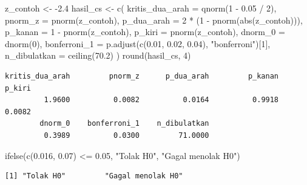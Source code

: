\documentclass[
  indonesian,
  letterpaper,
]{book}
\newenvironment{Shaded}{\begin{snugshade}}{\end{snugshade}}
\newcommand{\AttributeTok}[1]{\textcolor[rgb]{0.40,0.45,0.13}{#1}}
\newcommand{\DecValTok}[1]{\textcolor[rgb]{0.68,0.00,0.00}{#1}}
\newcommand{\FloatTok}[1]{\textcolor[rgb]{0.68,0.00,0.00}{#1}}
\newcommand{\FunctionTok}[1]{\textcolor[rgb]{0.28,0.35,0.67}{#1}}
\newcommand{\NormalTok}[1]{\textcolor[rgb]{0.00,0.23,0.31}{#1}}
\newcommand{\OtherTok}[1]{\textcolor[rgb]{0.00,0.23,0.31}{#1}}
\newcommand{\SpecialCharTok}[1]{\textcolor[rgb]{0.37,0.37,0.37}{#1}}
\newcommand{\StringTok}[1]{\textcolor[rgb]{0.13,0.47,0.30}{#1}}
\begin{document}
\begin{Shaded}
\begin{Highlighting}[]
\NormalTok{z\_contoh }\OtherTok{\textless{}{-}} \SpecialCharTok{{-}}\FloatTok{2.4}
\NormalTok{hasil\_cs }\OtherTok{\textless{}{-}} \FunctionTok{c}\NormalTok{(}
  \AttributeTok{kritis\_dua\_arah =} \FunctionTok{qnorm}\NormalTok{(}\DecValTok{1} \SpecialCharTok{{-}} \FloatTok{0.05} \SpecialCharTok{/} \DecValTok{2}\NormalTok{),}
  \AttributeTok{pnorm\_z         =} \FunctionTok{pnorm}\NormalTok{(z\_contoh),}
  \AttributeTok{p\_dua\_arah      =} \DecValTok{2} \SpecialCharTok{*}\NormalTok{ (}\DecValTok{1} \SpecialCharTok{{-}} \FunctionTok{pnorm}\NormalTok{(}\FunctionTok{abs}\NormalTok{(z\_contoh))),}
  \AttributeTok{p\_kanan         =} \DecValTok{1} \SpecialCharTok{{-}} \FunctionTok{pnorm}\NormalTok{(z\_contoh),}
  \AttributeTok{p\_kiri          =} \FunctionTok{pnorm}\NormalTok{(z\_contoh),}
  \AttributeTok{dnorm\_0         =} \FunctionTok{dnorm}\NormalTok{(}\DecValTok{0}\NormalTok{),}
  \AttributeTok{bonferroni\_1    =} \FunctionTok{p.adjust}\NormalTok{(}\FunctionTok{c}\NormalTok{(}\FloatTok{0.01}\NormalTok{, }\FloatTok{0.02}\NormalTok{, }\FloatTok{0.04}\NormalTok{), }\StringTok{"bonferroni"}\NormalTok{)[}\DecValTok{1}\NormalTok{],}
  \AttributeTok{n\_dibulatkan    =} \FunctionTok{ceiling}\NormalTok{(}\FloatTok{70.2}\NormalTok{)}
\NormalTok{)}
\FunctionTok{round}\NormalTok{(hasil\_cs, }\DecValTok{4}\NormalTok{)}
\end{Highlighting}
\end{Shaded}

\begin{verbatim}
kritis_dua_arah         pnorm_z      p_dua_arah         p_kanan          p_kiri 
         1.9600          0.0082          0.0164          0.9918          0.0082 
        dnorm_0    bonferroni_1    n_dibulatkan 
         0.3989          0.0300         71.0000 
\end{verbatim}

\begin{Shaded}
\begin{Highlighting}[]
\FunctionTok{ifelse}\NormalTok{(}\FunctionTok{c}\NormalTok{(}\FloatTok{0.016}\NormalTok{, }\FloatTok{0.07}\NormalTok{) }\SpecialCharTok{\textless{}=} \FloatTok{0.05}\NormalTok{, }\StringTok{"Tolak H0"}\NormalTok{, }\StringTok{"Gagal menolak H0"}\NormalTok{)}
\end{Highlighting}
\end{Shaded}

\begin{verbatim}
[1] "Tolak H0"         "Gagal menolak H0"
\end{verbatim}
\end{document}
